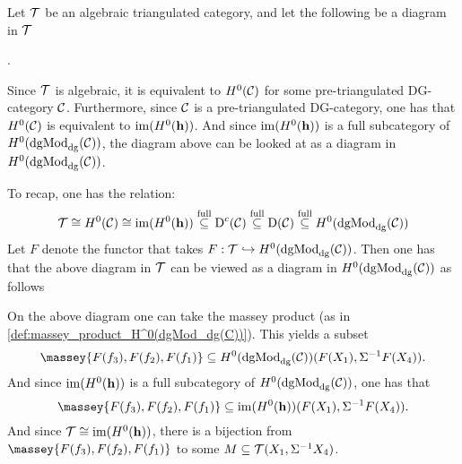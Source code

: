 \begin{remark}
    \label{rem:massey_in_alg_tri_cat}
    Let \( {\mathcal{T}} \) be an algebraic triangulated category, and let the following be a diagram in \( {\mathcal{T}} \)
    \begin{center}
        .
    \end{center}

    Since \( {\mathcal{T}} \) is algebraic, it is equivalent to \( H^0({\mathcal{C}}) \) for some pre-triangulated DG-category \( {\mathcal{C}} \). Furthermore, since \( {\mathcal{C}} \) is a pre-triangulated DG-category, one has that \( H^0({\mathcal{C}}) \) is equivalent to \( \operatorname{im}(H^0(\mathbf{h})) \). And since \( \operatorname{im}(H^0(\mathbf{h})) \) is a full subcategory of \( H^0(\operatorname{dgMod}_{\operatorname{dg}}({\mathcal{C}})) \), the diagram above can be looked at as a diagram in \( H^0(\operatorname{dgMod}_{\operatorname{dg}}({\mathcal{C}})) \).

    To recap, one has the relation:
    \[
        {\mathcal{T}} \cong H^0({\mathcal{C}}) \cong \operatorname{im}(H^0(\mathbf{h})) \stackrel{\text{full}}{\subseteq} \operatorname{D}^c({\mathcal{C}}) \stackrel{\text{full}}{\subseteq} \operatorname{D}({\mathcal{C}}) \stackrel{\text{full}}{\subseteq} H^0(\operatorname{dgMod}_{\operatorname{dg}}({\mathcal{C}}))
    \]
    Let \( F \) denote the functor that takes \( F: {\mathcal{T}} \hookrightarrow H^0(\operatorname{dgMod}_{\operatorname{dg}}({\mathcal{C}})) \). Then one has that the above diagram in \( {\mathcal{T}} \) can be viewed as a diagram in \( H^0(\operatorname{dgMod}_{\operatorname{dg}}({\mathcal{C}})) \) as follows
    \begin{center}
    \end{center}
    
    On the above diagram one can take the massey product (as in \autoref{def:massey_product_H^0(dgMod_dg(C))}). This yields a subset
    \[
        \massey{F(f_3), F(f_2), F(f_1)} \subseteq H^0(\dgMod_{\dg}(\Cc))(F(X_1), \Sigma^{-1} F(X_4)).
    \]
    And since \( \operatorname{im}(H^0(\mathbf{h})) \) is a full subcategory of \( H^0(\operatorname{dgMod}_{\operatorname{dg}}({\mathcal{C}})) \), one has that
    \[
        \massey{F(f_3), F(f_2), F(f_1)} \subseteq \im(H^0(\mathbf{h}))(F(X_1), \Sigma^{-1} F(X_4)).
    \]
    And since \( {\mathcal{T}} \cong \operatorname{im}(H^0(\mathbf{h})) \), there is a bijection from \( \massey{F(f_3), F(f_2), F(f_1)} \) to some \( M \subseteq {\mathcal{T}}(X_1, \Sigma^{-1} X_4) \).


\end{remark}
